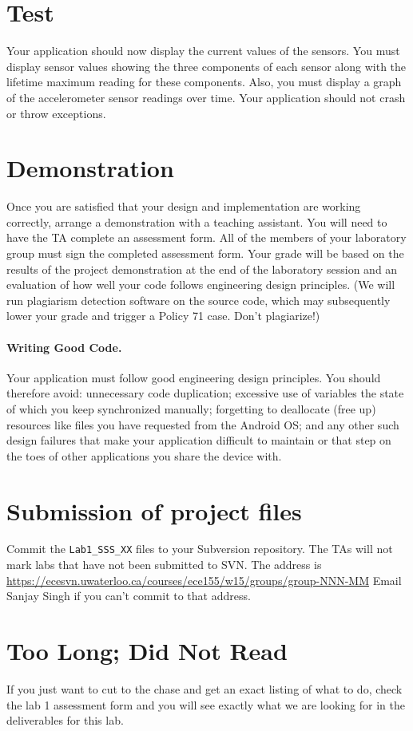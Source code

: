 \documentclass[10pt]{article}
\newcommand{\todo}[1]{{\red\textbf{TODO: }#1}\xspace}
\begin{document}
\section{Test}
Your application should now display the current values of the sensors. You must display sensor values showing the three components of each sensor along with the lifetime maximum reading for these components. Also, you must display a graph of the accelerometer sensor readings over time. Your application should not crash or throw exceptions.
\section{Demonstration}
Once you are satisfied that your design and implementation are working correctly, arrange a demonstration with a teaching assistant. You will need to have the TA complete an assessment form. All of the members of your laboratory group must sign the completed assessment form. Your grade will be based on the results of the project demonstration at the end of the laboratory session and an evaluation of how well your code follows engineering design principles. (We will run plagiarism detection software on the source code, which may subsequently lower your grade and trigger a Policy 71 case. Don't plagiarize!)
\paragraph{Writing Good Code.} Your application must follow good engineering design principles. You should therefore avoid: unnecessary code duplication; excessive use of variables the state of which you keep synchronized manually; forgetting to deallocate (free up) resources like files you have requested from the Android OS; and any other such design failures that make your application difficult to maintain or that step on the toes of other applications you share the device with.
\section{Submission of project files}
Commit the {\tt Lab1\_SSS\_XX} files to your Subversion repository. The TAs will not mark labs that have not been submitted to SVN. The address is
\url{https://ecesvn.uwaterloo.ca/courses/ece155/w15/groups/group-NNN-MM}
Email Sanjay Singh if you can't commit to that address.
\section{Too Long; Did Not Read}
If you just want to cut to the chase and get an exact listing of what to do, check the lab 1 assessment form and you will see exactly what we are looking for in the deliverables for this lab.
\end{document}
